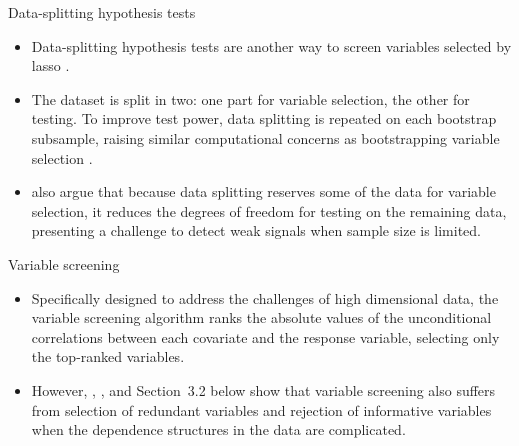 \documentclass{beamer}
\begin{document}
\begin{frame}{Data-splitting hypothesis tests}

  \begin{itemize}
    \item Data-splitting hypothesis tests are another way to screen variables selected by lasso \citep{wasserman2009high, meinshausen2009p,romano2019multiple, diciccio2020exact}.
    
    \item The dataset is split in two: one part for variable selection, the other for testing. To improve test power, data splitting is repeated on each bootstrap subsample, raising similar computational concerns as bootstrapping variable selection \citep{bach2008bolasso}.
    
    \item \citet{diciccio2020exact} also argue that because data splitting reserves some of the data for variable selection, it reduces the degrees of freedom for testing on the remaining data, presenting a challenge to detect weak signals when sample size is limited.
  \end{itemize}
\end{frame}


\begin{frame}{Variable screening}

  \begin{itemize}
    \item Specifically designed to address the challenges of high dimensional data, the variable screening algorithm \citep{fan2008sure, hall2009using,hall2009usingb, li2012robust, li2012feature} ranks the absolute values of the unconditional correlations between each covariate and the response variable, selecting only the top-ranked variables.
    
    \item However, \citet{fan2008sure}, \citet{barut2016conditional}, and Section~3.2 below show that variable screening also suffers from selection of redundant variables and rejection of informative variables when the dependence structures in the data are complicated.
  \end{itemize}
\end{frame}
\end{document}
